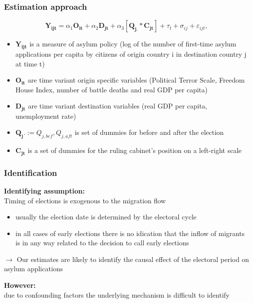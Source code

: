\documentclass[compress, xcolor = {table,xcdraw}]{beamer}
\begin{document}
\begin{frame}
\frametitle{Estimation approach}
\begin{equation}
\mathbf{Y_{ijt}} =\alpha_1 \mathbf{O_{it}} + \alpha_2 \mathbf{D_{jt}} + \alpha_3 [\mathbf{Q_{j.}} *  \mathbf{C_{jt}}] + \tau_t + \sigma_{ij} +  \varepsilon_{ijt},
\end{equation}
\smallskip
\begin{itemize}
	\small
	\item $\mathbf{Y_{ijt}}$ is a measure of asylum policy (log of the number of first-time asylum applications per capita by citizens of origin country i in destination country j at time t)
	\item $\mathbf{O_{it}}$ are time variant origin specific variables (Political Terror Scale, Freedom House Index, number of battle deaths and real GDP per capita) 
	\item $\mathbf{D_{jt}}$  are time variant destination variables (real GDP per capita, unemployment rate)
	\item $\mathbf{Q_j.} := Q_{j,bef}, Q_{j,aft}$ is set of dummies for before and after the election
	\item $\mathbf{C_{jt}}$ is a set of dummies for the ruling cabinet's position on a left-right scale

\end{itemize}
\end{frame}




\begin{frame}
\frametitle{Identification}
\textbf{Identifying assumption:} \\
Timing of elections is exogenous to the migration flow 

\begin{itemize}
	\item usually the election date is determined by the electoral cycle
	\item in all cases of early elections there is no idication that the inflow of migrants is in any way related to the decision to call early elections 
\end{itemize}

$\rightarrow$ Our estimates are likely to identify the causal effect of the electoral
period on asylum applications
\bigskip

\textbf{However:} \\
due to confounding factors the underlying mechanism is difficult to identify

\end{frame}
\end{document}
